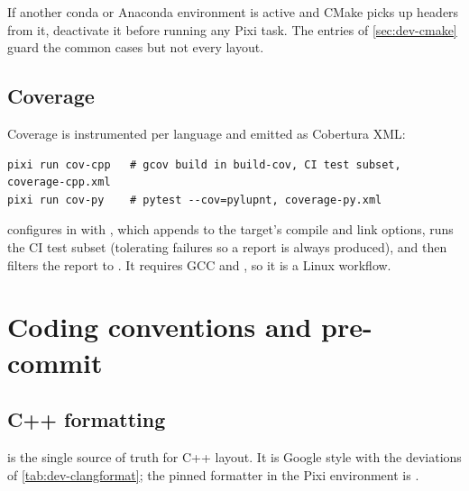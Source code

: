 \begin{lupntnote}
If another conda or Anaconda environment is active and CMake picks up headers
from it, deactivate it before running any Pixi task. The
 entries of \cref{sec:dev-cmake} guard the
common cases but not every layout.
\end{lupntnote}

\subsection{Coverage}

Coverage is instrumented per language and emitted as Cobertura XML:

\begin{lstlisting}[language=shell]
pixi run cov-cpp   # gcov build in build-cov, CI test subset, coverage-cpp.xml
pixi run cov-py    # pytest --cov=pylupnt, coverage-py.xml
\end{lstlisting}

 configures  in  with
, which appends
 to the  target's
compile and link options, runs the CI test subset (tolerating failures so a
report is always produced), and then filters the  report to
. It requires GCC and , so it is a Linux workflow.

\section{Coding conventions and pre-commit}
\label{sec:dev-style}

\subsection{C++ formatting}

 is the single source of truth for C++ layout. It is
Google style with the deviations of \cref{tab:dev-clangformat}; the pinned
formatter in the Pixi environment is .

